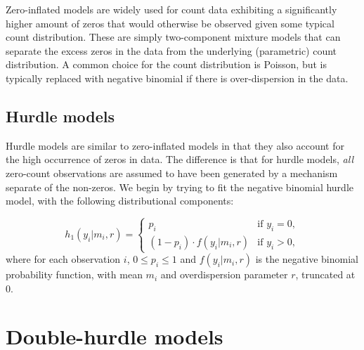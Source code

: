\documentclass[article]{jss}
\begin{document}
Zero-inflated models are widely used for count data exhibiting a significantly higher amount of zeros that would otherwise be observed given some typical count distribution. These are simply two-component mixture models that can separate the excess zeros in the data from the underlying (parametric) count distribution. A common choice for the count distribution is Poisson, but is typically replaced with negative binomial if there is over-dispersion in the data.


\subsection{Hurdle models}

Hurdle models are similar to zero-inflated models in that they also account for the high occurrence of zeros in data. The difference is that for hurdle models, \textit{all} zero-count observations are assumed to have been generated by a mechanism separate of the non-zeros. We begin by trying to fit the negative binomial hurdle model, with the following distributional components:

\begin{equation}
\label{nbhurdle}
  h_1(y_i | m_i,r) = 
  \begin{cases}
  p_i & \mbox{if } y_i=0,\\
  (1-p_i)\cdot f(y_i | m_i,r) & \mbox{if } y_i>0,
  \end{cases}
\end{equation}
where for each observation $i$, $0 \le p_i \le 1$ and $f(y_i | m_i,r)$ is the negative binomial probability function, with mean $m_i$ and overdispersion parameter $r$, truncated at 0.


\section{Double-hurdle models}



\end{document}
